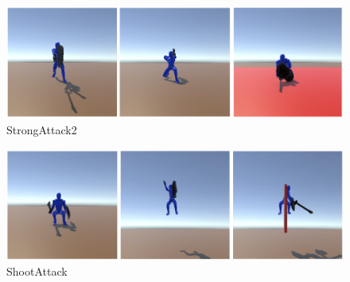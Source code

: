 \documentclass[a4paper,12pt,oneside,openany,titlepage]{jreport}
\begin{document}
\begin{figure}[h]
  \begin{center}
    \includegraphics[width=13cm]{FrameImage/BossAttack1.png}
    \caption{StrongAttack2}
    \label{}
  \end{center}
\end{figure}
\begin{figure}[h]
  \begin{center}
    \includegraphics[width=13cm]{FrameImage/ShootWeapon.png}
    \caption{ShootAttack}
    \label{}
  \end{center}
\end{figure}




\newpage
\end{document}
